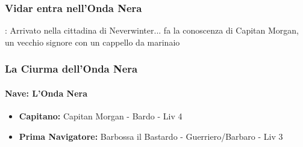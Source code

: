 \documentclass{article}
\begin{document}
              \subsubsection{Vidar entra nell'Onda Nera}: 
Arrivato nella cittadina di Neverwinter... fa la conoscenza di Capitan Morgan, un vecchio signore con un cappello da marinaio


              \subsubsection*{La Ciurma dell'Onda Nera}

                  \paragraph*{Nave: L'Onda Nera}

\begin{itemize}
  \item \textbf{Capitano:} Capitan Morgan - Bardo - Liv 4
  \item \textbf{Prima Navigatore:} Barbossa il Bastardo - Guerriero/Barbaro - Liv 3
\end{itemize}
\end{document}
